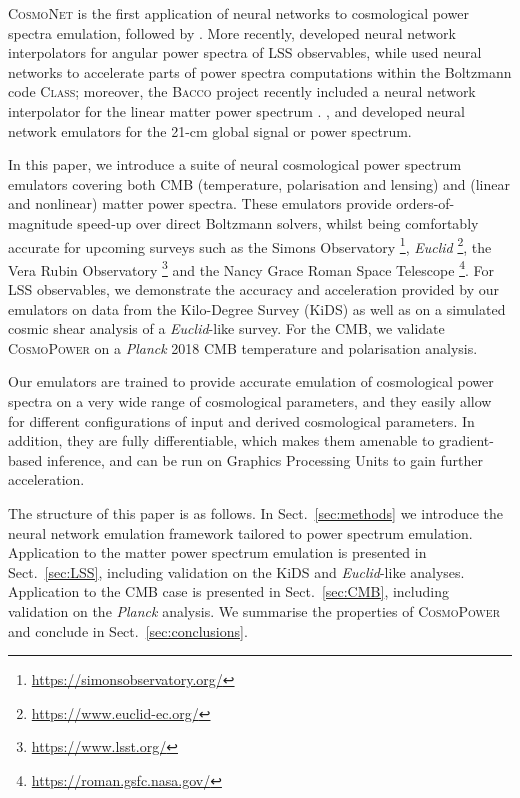\documentclass[fleqn,usenatbib]{mnras}
\begin{document}
\textsc{CosmoNet} \citep{Auld07, Auld08} is the first application of neural networks to cosmological power spectra emulation, followed by \citet{Agarwal12, Agarwal14}. More recently, \citet{ManriqueYus19} developed neural network interpolators for angular power spectra of LSS observables, while \citet{Albers19} used neural networks to accelerate parts of power spectra computations within the Boltzmann code \textsc{Class}; moreover, the \textsc{Bacco} project \citep{Angulo20} recently included a neural network interpolator for the linear matter power spectrum \citep{Arico21}. \citet{Kern17}, \citet{Schmit17} and \citet{Bevins21} developed neural network emulators for the 21-cm global signal or power spectrum. 

In this paper, we introduce a suite of neural cosmological power spectrum emulators covering both CMB (temperature, polarisation and lensing) and (linear and nonlinear) matter power spectra. These emulators provide orders-of-magnitude speed-up over direct Boltzmann solvers, whilst being comfortably accurate for upcoming surveys such as the Simons Observatory \citep{Ade19}\footnote{\url{https://simonsobservatory.org/}}, \textit{Euclid} \citep{Laureijs11}\footnote{\url{https://www.euclid-ec.org/}}, the Vera Rubin Observatory \citep{Ivezic19}\footnote{\url{https://www.lsst.org/}} and the Nancy Grace Roman Space Telescope \citep{Spergel15}\footnote{\url{https://roman.gsfc.nasa.gov/}}. For LSS observables, we demonstrate the accuracy and acceleration provided by our emulators on data from the Kilo-Degree Survey (KiDS) as well as on a simulated cosmic shear analysis of a \textit{Euclid}-like survey. For the CMB, we validate \textsc{CosmoPower} on a \textit{Planck} 2018 CMB temperature and polarisation analysis.

Our emulators are trained to provide accurate emulation of cosmological power spectra on a very wide range of cosmological parameters, and they easily allow for different configurations of input and derived cosmological parameters. In addition, they are fully differentiable, which makes them amenable to gradient-based inference, and can be run on Graphics Processing Units to gain further acceleration. 

The structure of this paper is as follows. In Sect.~\ref{sec:methods} we introduce the neural network emulation framework tailored to power spectrum emulation. Application to the matter power spectrum emulation is presented in Sect.~\ref{sec:LSS}, including validation on the KiDS and \textit{Euclid}-like analyses. Application to the CMB case is presented in Sect.~\ref{sec:CMB}, including validation on the \textit{Planck} analysis. We summarise the properties of \textsc{CosmoPower} and conclude in Sect.~\ref{sec:conclusions}.
\end{document}
